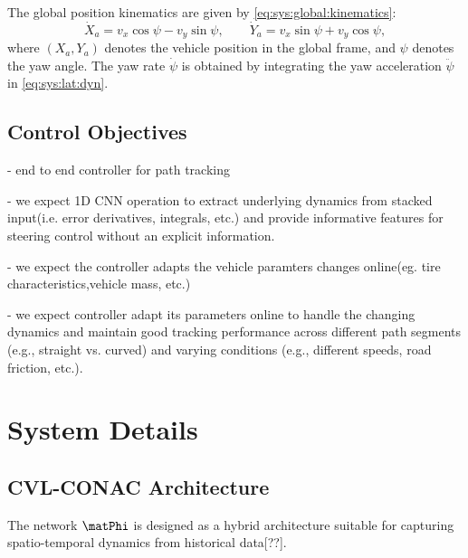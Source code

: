 \documentclass[conference]{IEEEtran}
\begin{document}
The global position kinematics are given by \eqref{eq:sys:global:kinematics}:
\begin{equation} \label{eq:sys:global:kinematics}
  \dot{X}_a 
  = 
  v_x \cos\psi
  - 
  v_y \sin\psi, \qquad
  \dot{Y}_a 
  = 
  v_x \sin\psi 
  + 
  v_y \cos\psi
  ,
\end{equation}
where $(X_a,Y_a)$ denotes the vehicle position in the global frame, and $\psi$ denotes the yaw angle. The yaw rate $\dot{\psi}$ is obtained by integrating the yaw acceleration $\ddot{\psi}$ in \eqref{eq:sys:lat:dyn}.

\subsection{Control Objectives}


- end to end controller for path tracking

- we expect 1D CNN operation to extract underlying 
dynamics from stacked input(i.e. error derivatives, integrals, etc.) and provide informative features for steering control without  an explicit information.

- we expect the controller adapts the vehicle paramters changes online(eg. tire characteristics,vehicle mass, etc.)

- we expect controller adapt its parameters online to handle the changing dynamics and maintain good tracking performance across different path segments (e.g., straight vs. curved) and varying conditions (e.g., different speeds, road friction, etc.).



\section{System Details}

\subsection{CVL-CONAC Architecture}
The network $\matPhi$ is designed as a hybrid architecture suitable for
capturing spatio-temporal dynamics from historical data[??].
\end{document}
